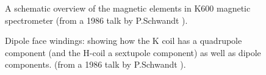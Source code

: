 \documentclass[11pt]{report}
\begin{document}
\begin{figure}[!ht]
\centerline{\vspace{0cm}\hspace{0cm}
}
\centering
\caption{A schematic overview of the magnetic elements in K600 magnetic spectrometer (from a 1986 talk by P.Schwandt \cite{Sch86}). }
\label{fig:k600-fig-magneticelements}
\end{figure} 

\begin{figure}[!ht]
\centerline{\vspace{0cm}\hspace{0cm}
}
\centering
\caption{Dipole face windings: showing how the K coil has a quadrupole component (and the H-coil a sextupole component)
as well as dipole components. (from a 1986 talk by P.Schwandt \cite{Sch86}). }
\label{fig:k600-fig-kh}
\end{figure} 
\end{document}
